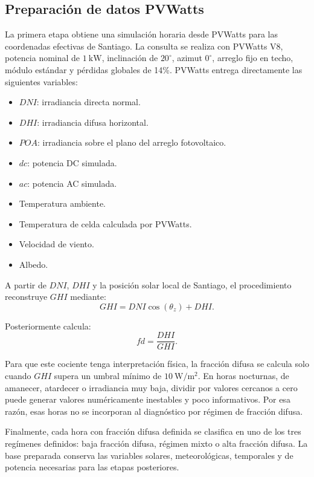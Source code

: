 \documentclass[12pt, letterpaper]{article}
\begin{document}
\subsection{Preparaci\'on de datos PVWatts}

La primera etapa obtiene una simulaci\'on horaria desde PVWatts para las coordenadas efectivas de Santiago. La consulta se realiza con PVWatts V8, potencia nominal de \(\SI{1}{\kilo\watt}\), inclinaci\'on de \(20^\circ\), azimut \(0^\circ\), arreglo fijo en techo, m\'odulo est\'andar y p\'erdidas globales de 14\%. PVWatts entrega directamente las siguientes variables:

\begin{itemize}
    \item \(DNI\): irradiancia directa normal.
    \item \(DHI\): irradiancia difusa horizontal.
    \item \(POA\): irradiancia sobre el plano del arreglo fotovoltaico.
    \item \(dc\): potencia DC simulada.
    \item \(ac\): potencia AC simulada.
    \item Temperatura ambiente.
    \item Temperatura de celda calculada por PVWatts.
    \item Velocidad de viento.
    \item Albedo.
\end{itemize}

A partir de \(DNI\), \(DHI\) y la posici\'on solar local de Santiago, el procedimiento reconstruye \(GHI\) mediante:
\[
    GHI = DNI \cos(\theta_z) + DHI.
\]

Posteriormente calcula:
\[
    fd = \frac{DHI}{GHI}.
\]

Para que este cociente tenga interpretación física, la fracción difusa se calcula solo cuando \(GHI\) supera un umbral mínimo de \(\SI{10}{\watt\per\square\meter}\). En horas nocturnas, de amanecer, atardecer o irradiancia muy baja, dividir por valores cercanos a cero puede generar valores numéricamente inestables y poco informativos. Por esa razón, esas horas no se incorporan al diagnóstico por régimen de fracción difusa.

Finalmente, cada hora con fracci\'on difusa definida se clasifica en uno de los tres reg\'imenes definidos: baja fracci\'on difusa, r\'egimen mixto o alta fracci\'on difusa. La base preparada conserva las variables solares, meteorol\'ogicas, temporales y de potencia necesarias para las etapas posteriores.
\end{document}

